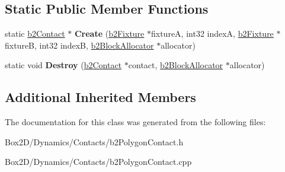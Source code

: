 \subsection*{Static Public Member Functions}
\begin{DoxyCompactItemize}
\item 
\mbox{\label{classb2_polygon_contact_a65356af432d877838e14755c5eb3c553}} 
static \hyperlink{classb2_contact}{b2\+Contact} $\ast$ {\bfseries Create} (\hyperlink{classb2_fixture}{b2\+Fixture} $\ast$fixtureA, int32 indexA, \hyperlink{classb2_fixture}{b2\+Fixture} $\ast$fixtureB, int32 indexB, \hyperlink{classb2_block_allocator}{b2\+Block\+Allocator} $\ast$allocator)
\item 
\mbox{\label{classb2_polygon_contact_a0cb55fd6af6f49d36c3cda15ffd96e63}} 
static void {\bfseries Destroy} (\hyperlink{classb2_contact}{b2\+Contact} $\ast$contact, \hyperlink{classb2_block_allocator}{b2\+Block\+Allocator} $\ast$allocator)
\end{DoxyCompactItemize}
\subsection*{Additional Inherited Members}


The documentation for this class was generated from the following files\+:\begin{DoxyCompactItemize}
\item 
Box2\+D/\+Dynamics/\+Contacts/b2\+Polygon\+Contact.\+h\item 
Box2\+D/\+Dynamics/\+Contacts/b2\+Polygon\+Contact.\+cpp\end{DoxyCompactItemize}
